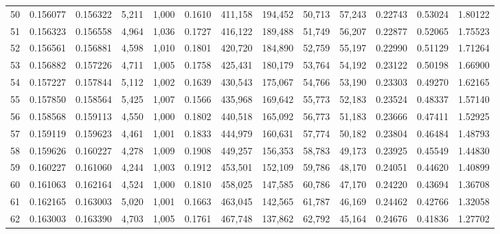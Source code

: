 \begin{tabular}{rrrrrrrrrrrrr}
50  &  0.156077 &  0.156322 &   5,211 &  1,000 &                                     0.1610 &  411,158 &  194,452 &   50,713 &   57,243 &  0.22743 &  0.53024 &  1.80122 \\
51  &  0.156323 &  0.156558 &   4,964 &  1,036 &                                     0.1727 &  416,122 &  189,488 &   51,749 &   56,207 &  0.22877 &  0.52065 &  1.75523 \\
52  &  0.156561 &  0.156881 &   4,598 &  1,010 &                                     0.1801 &  420,720 &  184,890 &   52,759 &   55,197 &  0.22990 &  0.51129 &  1.71264 \\
53  &  0.156882 &  0.157226 &   4,711 &  1,005 &                                     0.1758 &  425,431 &  180,179 &   53,764 &   54,192 &  0.23122 &  0.50198 &  1.66900 \\
54  &  0.157227 &  0.157844 &   5,112 &  1,002 &                                     0.1639 &  430,543 &  175,067 &   54,766 &   53,190 &  0.23303 &  0.49270 &  1.62165 \\
55  &  0.157850 &  0.158564 &   5,425 &  1,007 &                                     0.1566 &  435,968 &  169,642 &   55,773 &   52,183 &  0.23524 &  0.48337 &  1.57140 \\
56  &  0.158568 &  0.159113 &   4,550 &  1,000 &                                     0.1802 &  440,518 &  165,092 &   56,773 &   51,183 &  0.23666 &  0.47411 &  1.52925 \\
57  &  0.159119 &  0.159623 &   4,461 &  1,001 &                                     0.1833 &  444,979 &  160,631 &   57,774 &   50,182 &  0.23804 &  0.46484 &  1.48793 \\
58  &  0.159626 &  0.160227 &   4,278 &  1,009 &                                     0.1908 &  449,257 &  156,353 &   58,783 &   49,173 &  0.23925 &  0.45549 &  1.44830 \\
59  &  0.160227 &  0.161060 &   4,244 &  1,003 &                                     0.1912 &  453,501 &  152,109 &   59,786 &   48,170 &  0.24051 &  0.44620 &  1.40899 \\
60  &  0.161063 &  0.162164 &   4,524 &  1,000 &                                     0.1810 &  458,025 &  147,585 &   60,786 &   47,170 &  0.24220 &  0.43694 &  1.36708 \\
61  &  0.162165 &  0.163003 &   5,020 &  1,001 &                                     0.1663 &  463,045 &  142,565 &   61,787 &   46,169 &  0.24462 &  0.42766 &  1.32058 \\
62  &  0.163003 &  0.163390 &   4,703 &  1,005 &                                     0.1761 &  467,748 &  137,862 &   62,792 &   45,164 &  0.24676 &  0.41836 &  1.27702 \\

\end{tabular}
